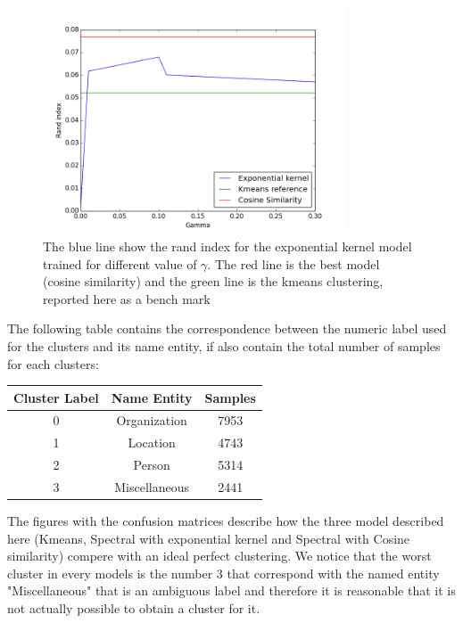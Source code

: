 \documentclass[]{article}
\begin{document}
	\begin{figure}\label{fig:best}
	\centering
	\includegraphics[width=0.8\textwidth]{Figures_Mik/results.png} 
	\caption{The blue line show the rand index for the  exponential kernel model trained for different value of $\gamma$. The red line is the best model (cosine similarity) and the green line is the kmeans clustering, reported here as a bench mark } 
\end{figure}
The following table contains the correspondence between the numeric label used for the clusters and its name entity, if also contain the total number of samples for each clusters: 
\begin{center}
	\begin{tabular}{ |c|c|c|} 
		\hline
		Cluster Label & Name Entity & Samples\\
		\hline
	0 & Organization & 7953\\
		\hline
1 & Location & 4743\\
		\hline
 2 & Person & 5314\\
		\hline
 3 & Miscellaneous & 2441\\
		\hline
	\end{tabular}
\end{center}
The figures with the confusion matrices describe how the three model described here (Kmeans, Spectral with exponential kernel and Spectral with Cosine similarity) compere with an ideal perfect clustering. We notice that the worst cluster in every models is the number 3 that correspond with the named entity "Miscellaneous" that is an ambiguous label and therefore it is reasonable that it is not actually possible to obtain a cluster for it.
	
\end{document}
